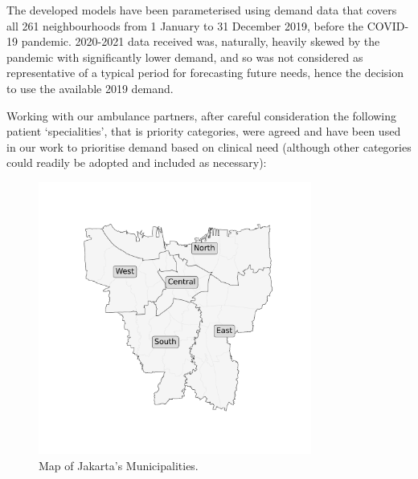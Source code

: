 \documentclass[preprint,12pt]{elsarticle}
\begin{document}


The developed models have been parameterised using demand data that covers all
261 neighbourhoods from 1 January to 31 December 2019, before the COVID-19
pandemic. 2020-2021 data received was, naturally, heavily skewed by the pandemic
with significantly  lower demand, and so was not considered as representative of
a typical period for forecasting future needs, hence the decision to use the
available 2019 demand.  

Working with our ambulance partners, after careful consideration the following
patient `specialities', that is priority categories, were agreed and have been
used in our work to prioritise demand based on clinical need (although other
categories could readily be adopted and included as necessary):

\begin{figure} \begin{center}
\includegraphics[width=0.8\textwidth]{img/jakarta_region_names.pdf} \end{center}
\caption{Map of Jakarta's Municipalities.} \label{fig:region_names} \end{figure}
\end{document}
